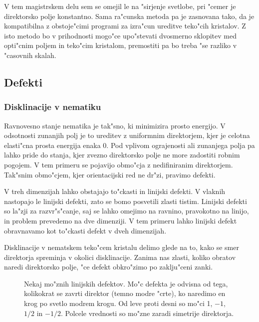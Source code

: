 \documentclass[a4paper,10pt]{article}
\begin{document}
V tem magistrskem delu sem se omejil le na "sirjenje svetlobe, pri "cemer je direktorsko polje konstantno. 
Sama ra"cunska metoda pa je zasnovana tako, da je kompatibilna z obstoje"cimi programi za izra"cun ureditve teko"cih kristalov\cite{ravnik-zumer-ldg}. 
Z isto metodo bo v prihodnosti mogo"ce upo"stevati dvosmerno sklopitev med opti"cnim poljem in teko"cim kristalom, premostiti pa bo treba "se razliko v "casovnih skalah. 

\subsection{Defekti}

\subsubsection{Disklinacije v nematiku}

Ravnovesno stanje nematika je tak"sno, ki minimizira prosto energijo. 
V odsotnosti zunanjih polj je to ureditev z uniformnim direktorjem, kjer je celotna elasti"cna prosta energija enaka 0\cite{mermin}. 
Pod vplivom ograjenosti ali zunanjega polja pa lahko pride do stanja, kjer zvezno direktorsko polje ne more zadostiti robnim pogojem. 
V tem primeru se pojavijo obmo"cja z nedifiniranim direktorjem. 
Tak"snim obmo"cjem, kjer orientacijski red ne dr"zi, pravimo defekti. 

V treh dimenzijah lahko obstajajo to"ckasti in linijski defekti\cite{degennes,kleman}. 
V vlaknih nastopajo le linijski defekti, zato se bomo posvetili zlasti tistim. 
Linijski defekti so la"zji za razvr"s"canje, saj se lahko omejimo na ravnino, pravokotno na linijo, in problem prevedemo na dve dimenziji. 
V tem primeru lahko linijski defekt obravnavamo kot to"ckasti defekt v dveh dimenzijah. 

Disklinacije v nematskem teko"cem kristalu delimo glede na to, kako se smer direktorja spreminja v okolici disklinacije. 
Zanima nas zlasti, koliko obratov naredi direktorsko polje, "ce defekt obkro"zimo po zaklju"ceni zanki. 

\begin{figure}[h]
 \centering
 \caption{Nekaj mo"znih linijskih defektov. Mo"c defekta je odvisna od tega, kolikokrat se zavrti direktor (temno modre "crte), ko naredimo en krog po svetlo modrem krogu. Od leve proti desni so mo"ci 1, $-1$, $1/2$ in $-1/2$. Polcele vrednosti so mo"zne zaradi simetrije direktorja. }
\end{figure}
\end{document}
